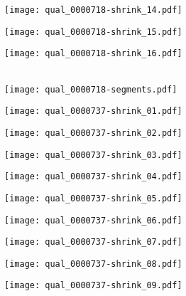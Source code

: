 \documentclass[10pt,twocolumn,letterpaper]{article}
\begin{document}
\begin{figure*}[t]
 \begin{minipage}{0.058\textwidth} \centering \texttt{[image: qual\_0000718-shrink\_14.pdf]} \end{minipage}
 \begin{minipage}{0.058\textwidth} \centering \texttt{[image: qual\_0000718-shrink\_15.pdf]} \end{minipage}
 \begin{minipage}{0.058\textwidth} \centering \texttt{[image: qual\_0000718-shrink\_16.pdf]} \end{minipage}
 \\ \vspace{2mm}
 \texttt{[image: qual\_0000718-segments.pdf]}
 \\ \vspace{2mm}
 \begin{minipage}{0.058\textwidth} \centering \texttt{[image: qual\_0000737-shrink\_01.pdf]} \end{minipage}
 \begin{minipage}{0.058\textwidth} \centering \texttt{[image: qual\_0000737-shrink\_02.pdf]} \end{minipage}
 \begin{minipage}{0.058\textwidth} \centering \texttt{[image: qual\_0000737-shrink\_03.pdf]} \end{minipage}
 \begin{minipage}{0.058\textwidth} \centering \texttt{[image: qual\_0000737-shrink\_04.pdf]} \end{minipage}
 \begin{minipage}{0.058\textwidth} \centering \texttt{[image: qual\_0000737-shrink\_05.pdf]} \end{minipage}
 \begin{minipage}{0.058\textwidth} \centering \texttt{[image: qual\_0000737-shrink\_06.pdf]} \end{minipage}
 \begin{minipage}{0.058\textwidth} \centering \texttt{[image: qual\_0000737-shrink\_07.pdf]} \end{minipage}
 \begin{minipage}{0.058\textwidth} \centering \texttt{[image: qual\_0000737-shrink\_08.pdf]} \end{minipage}
 \begin{minipage}{0.058\textwidth} \centering \texttt{[image: qual\_0000737-shrink\_09.pdf]} \end{minipage}

\end{figure*}
\end{document}
